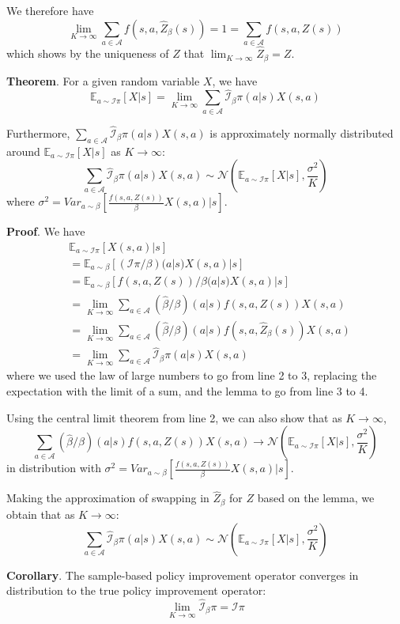 \documentclass{article}
\newcommand{\ipi}{\mathcal{I}\pi}
\newcommand{\sample}{\beta}
\newcommand{\ibpi}{\hat{\mathcal{I}}_{\sample}\pi}
\begin{document}
We therefore have
$$\lim_{K\to\infty} \sum_{a\in\mathcal{A}} f(s, a, \hat{Z}_\sample(s))=1=\sum_{a\in\mathcal{A}} f(s, a, Z(s))$$
which shows by the uniqueness of $Z$ that $\lim_{K\to\infty} \hat{Z}_\sample = Z$.

\textbf{Theorem}. For a given random variable $X$, we have
$$\mathbb{E}_{a\sim\ipi}[X|s] = \lim_{K\to\infty} \sum_{a\in\mathcal{A}} \ibpi(a|s) X(s, a)$$

Furthermore, $\sum_{a\in\mathcal{A}} \ibpi(a|s) X(s, a)$ is approximately normally distributed around $\mathbb{E}_{a\sim\ipi}[X|s]$ as $K\to\infty$:
$$\sum_{a\in\mathcal{A}} \ibpi(a|s) X(s, a) \sim \mathcal{N}(\mathbb{E}_{a\sim\ipi}[X|s], \frac{\sigma^2}{K})$$
where $\sigma^2 = Var_{a\sim\beta}[\frac{f(s, a, Z(s))}{\sample} X(s, a)|s]$.

\textbf{Proof}. We have
\begin{equation*}
\begin{split}
&  \mathbb{E}_{a\sim\ipi}[X(s,a)|s] \\
&= \mathbb{E}_{a\sim\sample}[(\ipi/\sample)(a|s) X(s,a)|s] \\
&= \mathbb{E}_{a\sim\sample}[f(s, a, Z(s))/\sample(a|s) X(s,a)|s] \\
&= \lim_{K\to\infty} \sum_{a\in\mathcal{A}} (\hat{\sample}/\sample)(a|s) f(s, a, Z(s)) X(s,a) \\
&= \lim_{K\to\infty} \sum_{a\in\mathcal{A}} (\hat{\sample}/\sample)(a|s) f(s, a, \hat{Z}_\sample(s)) X(s,a)\\
&= \lim_{K\to\infty} \sum_{a\in\mathcal{A}} \ibpi(a|s) X(s,a)
\end{split}
\end{equation*}
where we used the law of large numbers to go from line 2 to 3, replacing the expectation with the limit of a sum, and the lemma to go from line 3 to 4.

Using the central limit theorem from line 2, we can also show that as $K\to\infty$,
$$\sum_{a\in\mathcal{A}} (\hat{\sample}/\sample)(a|s) f(s, a, Z(s))X(s, a) \to \mathcal{N}(\mathbb{E}_{a\sim\ipi}[X|s], \frac{\sigma^2}{K})$$
in distribution with $\sigma^2 = Var_{a\sim\beta}[\frac{f(s, a, Z(s))}{\sample} X(s, a)|s]$.

Making the approximation of swapping in $\hat{Z}_\sample$ for $Z$ based on the lemma, we obtain that as $K\to\infty$:
$$\sum_{a\in\mathcal{A}} \ibpi(a|s) X(s, a) \sim \mathcal{N}(\mathbb{E}_{a\sim\ipi}[X|s], \frac{\sigma^2}{K})$$

\textbf{Corollary}.
The sample-based policy improvement operator converges in distribution to the true policy improvement operator:
$$\lim_{K\to\infty} \ibpi = \ipi$$
\end{document}
